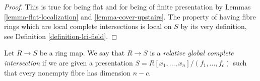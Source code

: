 \begin{proof}
This is true for being flat and for being of finite presentation by
Lemmas \ref{lemma-flat-localization} and \ref{lemma-cover-upstairs}.
The property of having fibre rings which are local complete intersections
is local on $S$ by its very definition, see
Definition \ref{definition-lci-field}.
\end{proof}

\begin{definition}
\label{definition-relative-global-complete-intersection}
Let $R \to S$ be a ring map. We say that $R \to S$ is
a {\it relative global complete intersection} if we are
given a presentation $S = R[x_1, \ldots, x_n]/(f_1, \ldots, f_c)$ such that
every nonempty fibre has dimension $n - c$.
\end{definition}

